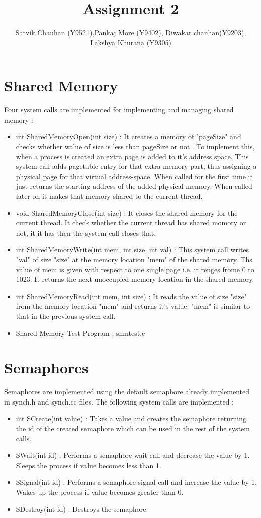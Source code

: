 \documentclass{article}
\title{Assignment 2}
\author{Satvik Chauhan (Y9521),Pankaj More (Y9402), Diwakar chauhan(Y9203), Lakshya Khurana (Y9305)}
\date{}
\begin{document}
\maketitle
\section*{Shared Memory}
Four system calls are implemented for implementing and managing shared memory :
\begin{itemize}
\item  int SharedMemoryOpen(int size) : It creates a memory of "pageSize" and checks whether walue of size is less than pageSize or not . To implement this, when a process is created an extra page is added to it's address space. This system call adds pagetable entry for that extra memory part, thus assigning a physical page for that virtual address-space. When called for the first time it just returns the starting address of the added physical memory. When called later on it makes that memory shared to the current thread.

\item void SharedMemoryClose(int size) : It closes the shared memory for the current thread. It check whether the current thread has shared momory or not, it it has then the system call closes that.

\item int SharedMemoryWrite(int mem, int size, int val) : This system call writes "val" of size "size" at the memory location "mem" of the shared memory. Ths value of mem is given with respect to one single page i.e. it renges frome 0 to 1023. It returns the next unoccupied memory location in the shared memory.

\item int SharedMemoryRead(int mem, int size) : It reads the value of size "size" from the memory location "mem" and returns it's value. "mem" is similar to that in the previous system call.

\item Shared Memory Test Program : shmtest.c 
\end{itemize}

\section*{Semaphores}
Semaphores are implemented using the default semaphore already implemented in synch.h and synch.cc files. The following system calls are implemented :
\begin{itemize}
\item int SCreate(int value) : Takes a value and creates the semaphore returning the id of the created semaphore which can be used in the rest of the system calls.
\item SWait(int id) : Performs a semaphore wait call and decrease the value by 1. Sleeps the process if value becomes less than 1.
\item SSignal(int id) : Performs a semaphore signal call and increase the value by 1. Wakes up the process if value becomes greater than 0.
\item SDestroy(int id) : Destroys the semaphore. 
\end{itemize}
\end{document}
